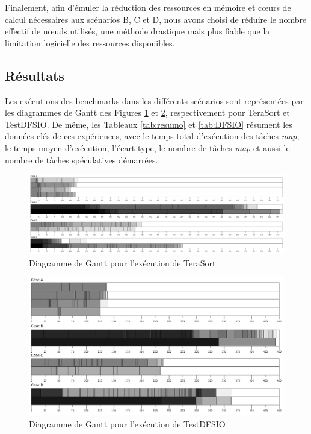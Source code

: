 Finalement, afin d'émuler la réduction des ressources en mémoire et c{\oe}urs de calcul nécessaires aux scénarios B, C et D, nous avons choisi de réduire le nombre effectif de n{\oe}uds utilisés, une méthode drastique mais plus fiable que la limitation logicielle des ressources disponibles.

\subsection{Résultats\label{sec:5.4}} 

Les exécutions des benchmarks dans les différents scénarios sont représentées par les diagrammes de Gantt des Figures \ref{fig:gantts} et \ref{fig:DFSIO}, respectivement pour TeraSort et TestDFSIO. De même, les Tableaux \ref{tab:resumo} et \ref{tab:DFSIO} résument les données clés de ces expériences, avec le temps total d'exécution des tâches \textit{map}, le temps moyen d'exécution, l'écart-type, le nombre de tâches \textit{map} et aussi le nombre de tâches spéculatives démarrées.  

\begin{figure}[!ht]
	\centering
	\includegraphics[width=1\textwidth]{img/todos}
	\caption{Diagramme de Gantt pour l'exécution de TeraSort}
	\label{fig:gantts}
\end{figure}

\begin{figure}[!ht]
	\centering
	\includegraphics[width=1\textwidth]{img/todos-DFSIO}
	\caption{Diagramme de Gantt pour l'exécution de TestDFSIO}
	\label{fig:DFSIO}
\end{figure}


